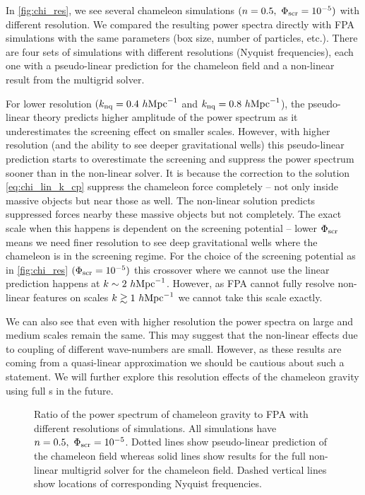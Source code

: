 In \autoref{fig:chi_res}, we see several chameleon simulations $(n=0.5,\ \Phi_{\text{\scriptsize scr}}=10^{-5})$ with different resolution. We compared the resulting power spectra directly with FPA simulations with the same parameters (box size, number of particles, etc.). There are four sets of simulations with different resolutions (Nyquist frequencies), each one with a pseudo-linear prediction for the chameleon field and a non-linear result from the multigrid solver.

For lower resolution $(k_{\rm nq} = 0.4~h\text{Mpc}^{-1}$ and $k_{\rm nq} = 0.8~h\text{Mpc}^{-1}$), the pseudo-linear theory predicts higher amplitude of the power spectrum as it underestimates the screening effect on smaller scales. However, with higher resolution (and the ability to see deeper gravitational wells) this pseudo-linear prediction starts to overestimate the screening and suppress the power spectrum sooner than in the non-linear solver. It is because the correction to the solution \eqref{eq:chi_lin_k_cp} suppress the chameleon force completely -- not only inside massive objects but near those as well. The non-linear solution predicts suppressed forces nearby these massive objects but not completely. The exact scale when this happens is dependent on the screening potential -- lower $\Phi_{\text{\scriptsize scr}}$ means we need finer resolution to see deep gravitational wells where the chameleon is in the screening regime. For the choice of the screening potential as in \autoref{fig:chi_res} $(\Phi_{\text{\scriptsize scr}}=10^{-5})$ this crossover where we cannot use the linear prediction happens at $k\sim2~h\text{Mpc}^{-1}$. However, as FPA cannot fully resolve non-linear features on scales $k\gtrsim1~h\text{Mpc}^{-1}$  we cannot take this scale exactly.

We can also see that even with higher resolution the power spectra on large and medium scales remain the same. This may suggest that the non-linear effects due to coupling of different wave-numbers are small. However, as these results are coming from a quasi-linear approximation we should be cautious about such a statement. We will further explore this resolution effects of the chameleon gravity using full \nbody s in the future.

\begin{figure}
  \centering
	\begin{subfigure}{1.0\textwidth}
	\end{subfigure}
	\begin{subfigure}{1.0\textwidth}
	\end{subfigure}
  \caption{Ratio of the power spectrum of chameleon gravity to FPA with different resolutions of simulations. All simulations have $n=0.5,\ \Phi_{\text{\scriptsize scr}}=10^{-5}$. Dotted lines show pseudo-linear prediction of the chameleon field whereas solid lines show results for the full non-linear multigrid solver for the chameleon field. Dashed vertical lines show locations of corresponding Nyquist frequencies.}
  \label{fig:chi_res}
\end{figure}

